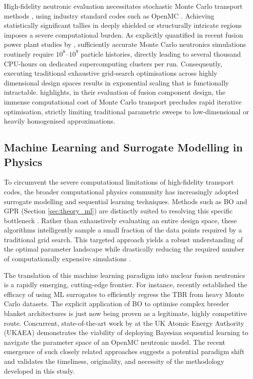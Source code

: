 \documentclass[11pt]{article}
\begin{document}
High-fidelity neutronic evaluation necessitates stochastic Monte Carlo transport methods
\citep{kalos_monte_2008}, using industry standard codes such as OpenMC \citep{romano_openmc_2015}.
Achieving statistically significant tallies in deeply shielded or structurally intricate regions
imposes a severe computational burden. As explicitly quantified in recent fusion power plant studies
by \cite{warmer_overview_2024}, sufficiently accurate Monte Carlo neutronics simulations routinely
require $10^8$--$10^9$ particle histories, directly leading to several thousand CPU-hours on
dedicated supercomputing clusters per run. Consequently, executing traditional exhaustive
grid-search optimisations across highly dimensional design spaces results in exponential scaling
that is functionally intractable. \cite{humphrey_machine_2023} highlights, in their evaluation of
fusion component design, the immense computational cost of Monte Carlo transport precludes rapid
iterative optimisation, strictly limiting traditional parametric sweeps to low-dimensional or
heavily homogenised approximations.

\subsection{Machine Learning and Surrogate Modelling in Physics}
\label{sec:ml_surrogate_modelling}

To circumvent the severe computational limitations of high-fidelity transport codes, the broader
computational physics community has increasingly adopted surrogate modelling and sequential learning
techniques. Methods such as BO and GPR (Section \ref{sec:theory_ml}) are distinctly suited to
resolving this specific bottleneck \citep{rasmussen2006gaussian}. Rather than exhaustively
evaluating an entire design space, these algorithms intelligently sample a small fraction of the
data points required by a traditional grid search. This targeted approach yields a robust
understanding of the optimal parameter landscape while drastically reducing the required number of
computationally expensive simulations \citep{emmerich2005single, shahriari2015taking}.

The translation of this machine learning paradigm into nuclear fusion neutronics is a rapidly
emerging, cutting-edge frontier. For instance, \cite{manek_fast_2023} recently established the
efficacy of using ML surrogates to efficiently regress the TBR from heavy Monte Carlo datasets. The
explicit application of BO to optimise complex breeder blanket architectures is just now being
proven as a legitimate, highly competitive route. Concurrent, state-of-the-art work by
\cite{humphrey_accelerating_2026} at the UK Atomic Energy Authority (UKAEA) demonstrates the
viability of deploying Bayesian sequential learning to navigate the parameter space of an OpenMC
neutronic model. The recent emergence of such closely related approaches suggests a potential
paradigm shift and validates the timeliness, originality, and necessity of the methodology developed
in this study.
\end{document}
